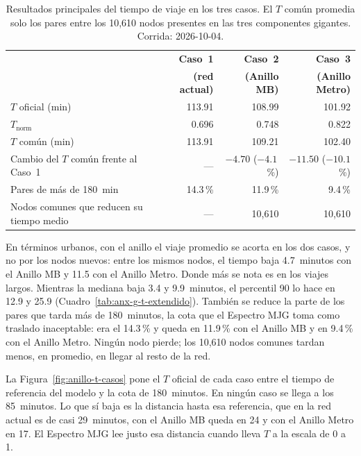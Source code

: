 \begin{table}[H]
    \centering
    \caption[Tiempo de viaje en los tres casos]{%
    Resultados principales del tiempo de viaje en los tres casos. El $T$ común
    promedia solo los pares entre los 10,610 nodos presentes en las tres
    componentes gigantes. Corrida: 2026-10-04.}
    \label{tab:anillo-t}
    \small
    \begin{tabular}{|p{6.4cm}|r|r|r|}
        \hline
        & \textbf{Caso~1} & \textbf{Caso~2} & \textbf{Caso~3} \\
        & \textbf{(red actual)} & \textbf{(Anillo MB)} &
          \textbf{(Anillo Metro)} \\
        \hline
        $T$ oficial (min)                       & 113.91 & 108.99 & 101.92 \\
        $T_{\text{norm}}$                       & 0.696  & 0.748  & 0.822 \\
        $T$ común (min)                         & 113.91 & 109.21 & 102.40 \\
        Cambio del $T$ común frente al Caso~1   & ---    & $-4.70$ ($-4.1$\,\%) &
            $-11.50$ ($-10.1$\,\%) \\
        Pares de más de 180~min                 & 14.3\,\% & 11.9\,\% & 9.4\,\% \\
        Nodos comunes que reducen su tiempo medio & ---  & 10,610 & 10,610 \\
        \hline
    \end{tabular}
\end{table}

En términos urbanos, con el anillo el viaje promedio se acorta en los dos casos,
y no por los nodos nuevos: entre los mismos nodos, el tiempo baja 4.7~minutos
con el Anillo MB y 11.5 con el Anillo Metro. Donde más se nota es en los viajes
largos. Mientras la mediana baja 3.4 y 9.9~minutos, el percentil 90 lo hace en
12.9 y 25.9 (Cuadro~\ref{tab:anx-g-t-extendido}). También se reduce la parte de
los pares que tarda más de 180~minutos, la cota que el Espectro MJG toma como
traslado inaceptable: era el 14.3\,\% y queda en 11.9\,\% con el Anillo MB y en
9.4\,\% con el Anillo Metro. Ningún nodo pierde; los 10,610 nodos comunes tardan
menos, en promedio, en llegar al resto de la red.

La Figura~\ref{fig:anillo-t-casos} pone el $T$ oficial de cada caso entre el
tiempo de referencia del modelo y la cota de 180~minutos. En ningún caso se
llega a los 85~minutos. Lo que sí baja es la distancia hasta esa referencia,
que en la red actual es de casi 29~minutos, con el Anillo MB queda en 24 y con
el Anillo Metro en 17. El Espectro MJG lee justo esa distancia cuando lleva $T$
a la escala de 0 a 1.


